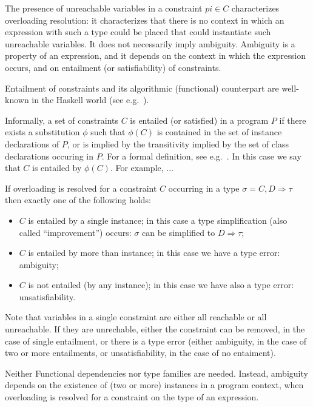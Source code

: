 The presence of unreachable variables in a constraint $pi\in C$
characterizes overloading resolution: it characterizes that there is
no context in which an expression with such a type could be placed
that could instantiate such unreachable variables. It does not
necessarily imply ambiguity. Ambiguity is a property of an expression,
and it depends on the context in which the expression occurs, and on
entailment (or satisfiability) of constraints.

Entailment of constraints and its algorithmic (functional) counterpart
are well-known in the Haskell world (see
e.g.~\cite{MarkJones94a,TheoryOfOverloading,JBCS-Ambiguity-and-constrained-polymorphism}).

Informally, a set of constraints $C$ is entailed (or satisfied) in a
program $P$ if there exists a substitution $\phi$ such that $\phi(C)$
is contained in the set of instance declarations of $P$, or is implied
by the transitivity implied by the set of class declarations occuring
in $P$. For a formal definition, see
e.g.~\cite{MarkJones94a,JBCS-Ambiguity-and-constrained-polymorphism}. In
this case we say that $C$ is entailed by $\phi(C)$. For example, ...

If overloading is resolved for a constraint $C$ occurring in a type
$\sigma = C,D \Rightarrow \tau$ then exactly one of the following
holds:

\begin{itemize}

\item $C$ is entailed by a single instance; in this case a type
  simplification (also called ``improvement'') occurs: $\sigma$ can be
  simplified to $D \Rightarrow \tau$;

\item $C$ is entailed by more than instance; in this case we have a
  type error: ambiguity; 

\item $C$ is not entailed (by any instance); in this case we have also
  a type error: unsatisfiability.

\end{itemize}

Note that variables in a single constraint are either all reachable or
all unreachable. If they are unrechable, either the constraint can be
removed, in the case of single entailment, or there is a type error
(either ambiguity, in the case of two or more entailments, or
unsatisfiability, in the case of no entaiment).

Neither Functional dependencies nor type families are needed. Instead,
ambiguity depends on the existence of (two or more) instances in a
program context, when overloading is resolved for a constraint on the
type of an expression.

